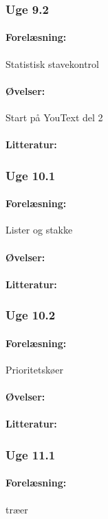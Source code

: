 \documentclass[12pt]{article}
\begin{document}
\subsubsection{Uge 9.2}
\paragraph{Forelæsning:} 
Statistisk stavekontrol
\paragraph{Øvelser:}
Start på YouText del 2
\paragraph{Litteratur:}

\subsubsection{Uge 10.1}
\paragraph{Forelæsning:} 
Lister og stakke
\paragraph{Øvelser:}
\paragraph{Litteratur:}

\subsubsection{Uge 10.2}
\paragraph{Forelæsning:} 
Prioritetskøer
\paragraph{Øvelser:}
\paragraph{Litteratur:}

\subsubsection{Uge 11.1}
\paragraph{Forelæsning:} 
træer
\end{document}
